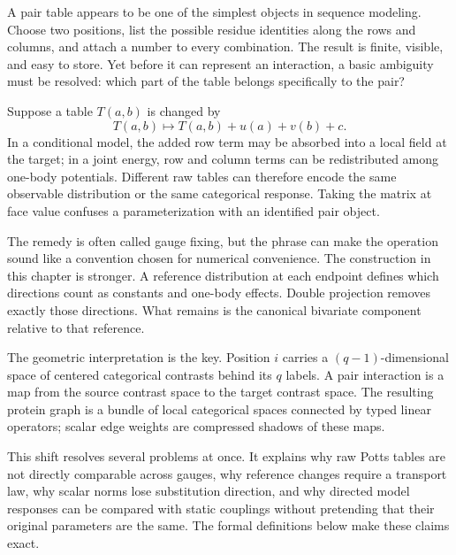 A pair table appears to be one of the simplest objects in sequence modeling.  Choose two positions,
list the possible residue identities along the rows and columns, and attach a number to every
combination.  The result is finite, visible, and easy to store.  Yet before it can represent an
interaction, a basic ambiguity must be resolved: which part of the table belongs specifically to
the pair?

Suppose a table $T(a,b)$ is changed by
\begin{equation}
T(a,b)\longmapsto T(a,b)+u(a)+v(b)+c.
\label{eq:book-table-gauge-opening}
\end{equation}
In a conditional model, the added row term may be absorbed into a local field at the target; in a
joint energy, row and column terms can be redistributed among one-body potentials.  Different raw
tables can therefore encode the same observable distribution or the same categorical response.
Taking the matrix at face value confuses a parameterization with an identified pair object.

The remedy is often called gauge fixing, but the phrase can make the operation sound like a
convention chosen for numerical convenience.  The construction in this chapter is stronger.  A
reference distribution at each endpoint defines which directions count as constants and one-body
effects.  Double projection removes exactly those directions.  What remains is the canonical
bivariate component relative to that reference.

The geometric interpretation is the key.  Position $i$ carries a $(q-1)$-dimensional space of
centered categorical contrasts behind its $q$ labels.  A pair interaction is a map from the source
contrast space to the target contrast space.  The resulting protein graph is a bundle of local
categorical spaces connected by typed linear operators; scalar edge weights are compressed shadows
of these maps.

This shift resolves several problems at once.  It explains why raw Potts tables are not directly
comparable across gauges, why reference changes require a transport law, why scalar norms lose
substitution direction, and why directed model responses can be compared with static couplings
without pretending that their original parameters are the same.  The formal definitions below
make these claims exact.
